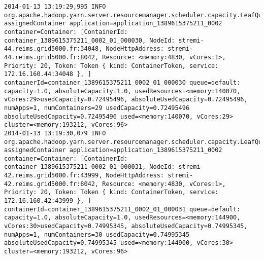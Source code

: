 \begin{lstlisting}
2014-01-13 13:19:29,995 INFO org.apache.hadoop.yarn.server.resourcemanager.scheduler.capacity.LeafQueue: assignedContainer application=application_1389615375211_0002 container=Container: [ContainerId: container_1389615375211_0002_01_000030, NodeId: stremi-44.reims.grid5000.fr:34048, NodeHttpAddress: stremi-44.reims.grid5000.fr:8042, Resource: <memory:4830, vCores:1>, Priority: 20, Token: Token { kind: ContainerToken, service: 172.16.160.44:34048 }, ] containerId=container_1389615375211_0002_01_000030 queue=default: capacity=1.0, absoluteCapacity=1.0, usedResources=<memory:140070, vCores:29>usedCapacity=0.72495496, absoluteUsedCapacity=0.72495496, numApps=1, numContainers=29 usedCapacity=0.72495496 absoluteUsedCapacity=0.72495496 used=<memory:140070, vCores:29> cluster=<memory:193212, vCores:96>
2014-01-13 13:19:30,079 INFO org.apache.hadoop.yarn.server.resourcemanager.scheduler.capacity.LeafQueue: assignedContainer application=application_1389615375211_0002 container=Container: [ContainerId: container_1389615375211_0002_01_000031, NodeId: stremi-42.reims.grid5000.fr:43999, NodeHttpAddress: stremi-42.reims.grid5000.fr:8042, Resource: <memory:4830, vCores:1>, Priority: 20, Token: Token { kind: ContainerToken, service: 172.16.160.42:43999 }, ] containerId=container_1389615375211_0002_01_000031 queue=default: capacity=1.0, absoluteCapacity=1.0, usedResources=<memory:144900, vCores:30>usedCapacity=0.74995345, absoluteUsedCapacity=0.74995345, numApps=1, numContainers=30 usedCapacity=0.74995345 absoluteUsedCapacity=0.74995345 used=<memory:144900, vCores:30> cluster=<memory:193212, vCores:96>
\end{lstlisting}
